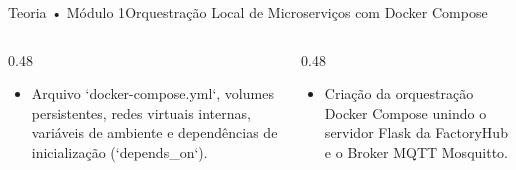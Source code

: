 \begin{senaiframe}{Teoria • Módulo 1}{Orquestração Local de Microserviços com Docker Compose}
  \begin{columns}[t]
    \begin{column}{0.48\textwidth}
      \begin{tcolorbox}[senaibluecard, title={Fundamentos Teóricos}]
        \begin{itemize}
          \item Arquivo `docker-compose.yml`, volumes persistentes, redes virtuais internas, variáveis de ambiente e dependências de inicialização (`depends_on`).
        \end{itemize}
      \end{tcolorbox}
    \end{column}
    \begin{column}{0.48\textwidth}
      \begin{tcolorbox}[senaigreencard, title={Prática \& Laboratório}]
        \begin{itemize}
          \item Criação da orquestração Docker Compose unindo o servidor Flask da FactoryHub e o Broker MQTT Mosquitto.
        \end{itemize}
      \end{tcolorbox}
    \end{column}
  \end{columns}
\end{senaiframe}
